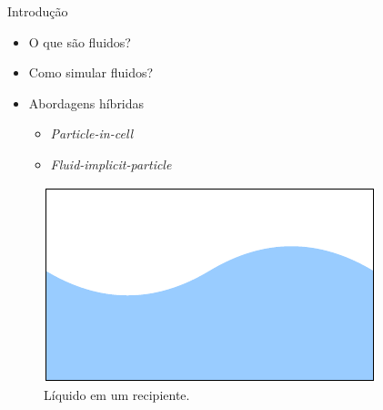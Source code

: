 \documentclass[aspectratio=169,xcolor=dvipsnames]{beamer}
\begin{document}
\begin{frame}{Introdução}
    \begin{itemize}[<+->]
        \item O que são fluidos?
        \item Como simular fluidos?
        \item Abordagens híbridas
        \begin{itemize}[<3->]
            \item \textit{Particle-in-cell}
            \item \textit{Fluid-implicit-particle}
        \end{itemize}
    \end{itemize}
    
    {
        \begin{figure}
            \centering
            \includegraphics{figures/liquid.pdf}
            \caption{Líquido em um recipiente.}
            \label{fig:liquid}
        \end{figure}
    }
    

\end{frame}
\end{document}
